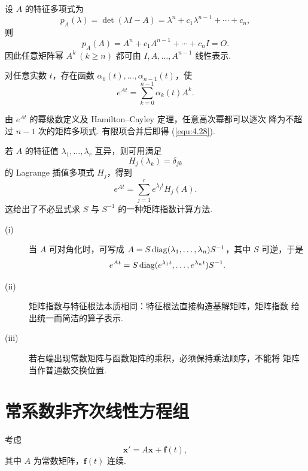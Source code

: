 \begin{thm}\label{thm:4.4.5}
设 $A$ 的特征多项式为
\[
p_A(\lambda)=\det(\lambda I-A)
=\lambda^n+c_1\lambda^{n-1}+\cdots+c_n,
\]
则
\[
p_A(A)=A^n+c_1A^{n-1}+\cdots+c_nI=O.
\]
因此任意矩阵幂 $A^k\ (k\ge n)$ 都可由
$I,A,\ldots,A^{n-1}$ 线性表示.
\end{thm}

\begin{cor}\label{cor:4.4.2}
对任意实数 $t$，存在函数 $\alpha_0(t),\ldots,\alpha_{n-1}(t)$，使
\begin{equation}\label{equ:4.28}
e^{At}
=\sum_{k=0}^{n-1}\alpha_k(t)A^k.
\end{equation}
\end{cor}

\begin{pf1}
由 $e^{At}$ 的幂级数定义及 Hamilton--Cayley 定理，任意高次幂都可以逐次
降为不超过 $n-1$ 次的矩阵多项式. 有限项合并后即得 (\ref{equ:4.28}).
\end{pf1}

\begin{rmk}
若 $A$ 的特征值 $\lambda_1,\ldots,\lambda_r$ 互异，则可用满足
\[
H_j(\lambda_k)=\delta_{jk}
\]
的 Lagrange 插值多项式 $H_j$，得到
\[
e^{At}=\sum_{j=1}^{r}e^{\lambda_jt}H_j(A).
\]
这给出了不必显式求 $S$ 与 $S^{-1}$ 的一种矩阵指数计算方法.
\end{rmk}

\begin{rmk}
\begin{description}
\item[(i)] 当 $A$ 可对角化时，可写成
$A=S\operatorname{diag}(\lambda_1,\ldots,\lambda_n)S^{-1}$，其中 $S$ 可逆，于是
\[
e^{At}
=S\operatorname{diag}(e^{\lambda_1t},\ldots,e^{\lambda_nt})S^{-1}.
\]
\item[(ii)] 矩阵指数与特征根法本质相同：特征根法直接构造基解矩阵，矩阵指数
给出统一而简洁的算子表示.
\item[(iii)] 若右端出现常数矩阵与函数矩阵的乘积，必须保持乘法顺序，不能将
矩阵当作普通数交换位置.
\end{description}
\end{rmk}

\section{常系数非齐次线性方程组}\label{sec:4.5}

考虑
\begin{equation}\label{equ:4.29}
\bm{x}'=A\bm{x}+\bm{f}(t),
\end{equation}
其中 $A$ 为常数矩阵，$\bm{f}(t)$ 连续.

